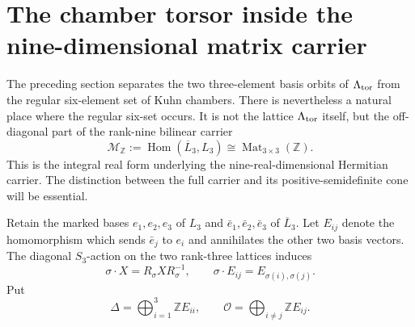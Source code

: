 \section{The chamber torsor inside the nine-dimensional matrix carrier}
\label{rnmt:sec:matrix-torsor}

The preceding section separates the two three-element basis orbits of
\(\Lambda_{\rm tor}\) from the regular six-element set of Kuhn chambers.
There is nevertheless a natural place where the regular six-set occurs.  It
is not the lattice \(\Lambda_{\rm tor}\) itself, but the off-diagonal part of
the rank-nine bilinear carrier
\[
 \mathcal M_{\mathbb Z}
 :=\operatorname{Hom}(\overline L_3,L_3)
 \cong\operatorname{Mat}_{3\times3}(\mathbb Z).
\]
This is the integral real form underlying the nine-real-dimensional
Hermitian carrier.  The distinction between the full carrier and its
positive-semidefinite cone will be essential.

Retain the marked bases \(e_1,e_2,e_3\) of \(L_3\) and
\(\bar e_1,\bar e_2,\bar e_3\) of \(\overline L_3\).  Let \(E_{ij}\) denote
the homomorphism which sends \(\bar e_j\) to \(e_i\) and annihilates the
other two basis vectors.  The diagonal \(S_3\)-action on the two rank-three
lattices induces
\begin{equation}
 \sigma\cdot X=R_\sigma X R_\sigma^{-1},
 \qquad \sigma\cdot E_{ij}=E_{\sigma(i),\sigma(j)}.
 \label{rnmt:eq:conjugation-action}
\end{equation}
Put
\begin{equation}
 \Delta=\bigoplus_{i=1}^3\mathbb ZE_{ii},
 \qquad
 \mathcal O=\bigoplus_{i\ne j}\mathbb ZE_{ij}.
 \label{rnmt:eq:diagonal-offdiagonal}
\end{equation}

